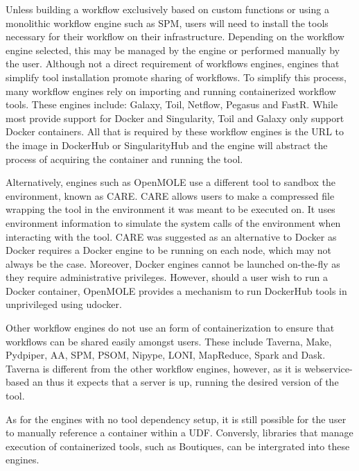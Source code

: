 \documentclass{report}
\begin{document}
            Unless building a workflow exclusively based on custom
            functions or using a monolithic workflow engine such as SPM, users
            will need to install the tools necessary for their workflow on
            their infrastructure. Depending on the workflow engine 
            selected, this may be managed by the engine or performed manually 
            by the user. Although not a direct requirement of workflows engines, 
            engines that simplify tool installation promote sharing of 
            workflows. To simplify this process, many workflow engines rely on 
            importing and running containerized workflow tools. These engines
            include: Galaxy, Toil, Netflow, Pegasus and FastR. While most 
            provide support for Docker and Singularity, Toil and Galaxy only 
            support Docker containers. All that is required by these workflow 
            engines is the URL to the image in DockerHub or SingularityHub and
            the engine will abstract the process of acquiring the container and
            running the tool.

            Alternatively, engines such as OpenMOLE use a different tool to
            sandbox the environment, known as CARE. CARE allows 
            users to make a compressed file wrapping the tool in the 
            environment it was meant to be executed on. It uses environment 
            information to simulate the system calls of the environment when
            interacting with the tool. CARE was suggested as an alternative to
            Docker as Docker requires a Docker engine to be running on each 
            node, which may not always be the case. Moreover, Docker engines 
            cannot be launched on-the-fly as they require administrative 
            privileges. However, should a user wish to run a Docker container,
            OpenMOLE provides a mechanism to run DockerHub tools in 
            unprivileged using udocker.

            Other workflow engines do not use an form of containerization to
            ensure that workflows can be shared easily amongst users. These 
            include Taverna, Make, Pydpiper, AA, SPM, PSOM, Nipype, LONI, 
            MapReduce, Spark and Dask.
            Taverna is different from the other workflow engines, however, as 
            it is webservice-based an thus it expects that a server is up, 
            running the desired version of the tool.

            As for the engines with no tool dependency setup, it is still 
            possible for the user to manually reference a container within 
            a UDF. Conversly, libraries that manage execution of containerized 
            tools, such as Boutiques, can be intergrated into these engines.
\end{document}
